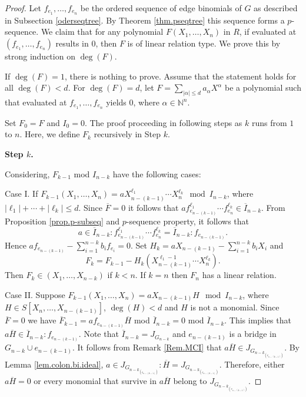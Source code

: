 \documentclass[11pt,a4paper,reqno]{amsart}
\theoremstyle{definition}
\begin{document}
\begin{proof}
     Let $f_{e_1},\ldots,f_{e_n}$ be the ordered sequence of edge binomials of $G$ as described in Subsection \ref{oderseqtree}. By Theorem \ref{thm.pseqtree} this sequence forms a $p$-sequence. We claim that for any polynomial $F(X_1,\ldots,X_n)$ in $R$, if evaluated at $(f_{e_1},\ldots,f_{e_n})$ results in $0$, then $F$ is of linear relation type. We prove this by strong induction on $\deg(F)$. 
     
     If $\deg(F)=1$, there is nothing to prove. Assume that the statement holds for all $\deg(F) < d$. For $\deg(F)=d$, let $F=\sum_{\lvert \alpha \rvert \leq d}a_{\alpha}X^{\alpha}$ be a polynomial such that evaluated at $f_{e_1},\ldots,f_{e_n}$ yields $0$, where $\alpha \in \mathbb{N}^n$. 
     
     \vspace{2mm}

     Set $F_0=F$ and $I_0=0$. The proof proceeding in following steps as $k$ runs from $1$ to $n$. Here, we define $F_k$ recursively in Step $k$. 
     
     \vspace{2mm}
   
    
    \textbf{Step $k$.}
    
    Considering, $F_{k-1}$ mod $I_{n-k}$  have the following cases:

    \vspace{2mm}
    
    Case I. If $F_{k-1}(X_1,\ldots,X_n) = aX_{n-(k-1)}^{\ell_1}\cdots X_n^{\ell_k} \mod I_{n-k}$, where $\lvert \ell_1 \rvert + \cdots + \lvert \ell_k \rvert \leq d$. Since $\overline{F}=0$ it follows that $af_{e_{n-(k-1)}}^{\ell_1}\cdots f_{e_{n}}^{\ell_k} \in \overline{I}_{n-k}$. From Proposition \ref{prop.p-subseq} and $p$-sequence property, it follows that  
    $$a \in \overline{I}_{n-k}:f_{e_{n-(k-1)}}^{\ell_1}\cdots f_{e_{n}}^{\ell_k} = \overline{I}_{n-k}:f_{e_{n-(k-1)}}.$$ 
    Hence $af_{e_{n-(k-1)}}-\sum_{i=1}^{n-k}b_if_{e_i} = 0$. Set $H_k=aX_{n-(k-1)}-\sum_{i=1}^{n-k}b_iX_i$ and $$F_k=F_{k-1}-H_k(X_{n-(k-1)}^{\ell_1-1}\cdots X_n^{\ell_k}).$$ Then $F_k \in (X_1,\ldots,X_{n-k})$ if $k<n$. If $k=n$ then $F_n$ has a linear relation.
    
    \vspace{2mm}
    
    Case II. Suppose $F_{k-1}(X_1,\ldots,X_n) = aX_{n-(k-1)}H \mod I_{n-k}$, where $H \in S[X_n,\ldots,X_{n-(k-1)}]$, $\deg(H)<d$ and $H$ is not a monomial. Since $\overline{F}=0$ we have $\overline{F}_{k-1} = af_{e_{n-(k-1)}}\overline{H}$ mod $\overline{I}_{n-k} = 0 $ mod $\overline{I}_{n-k}$. This implies that $a\overline{H} \in \overline{I}_{n-k}:f_{e_{n-(k-1)}}$.  Note that $\overline{I}_{n-k}=J_{G_{n-k}}$ and $e_{n-(k-1)}$ is a bridge in $G_{n-k} \cup e_{n-(k-1)}$. It follows from Remark \ref{Rem.MCI} that $a\overline{H} \in J_{G_{n-k_{(e_{n-(k-1)})}}}$. By Lemma \ref{lem.colon.bi.ideal},  $a \in J_{G_{n-k_{(e_{n-(k-1)})}}}: \overline{H}= J_{G_{n-k_{(e_{n-(k-1)})}}}$. Therefore, either $a\overline{H}=0$ or every monomial that survive in $a\overline{H}$ belong to $J_{G_{n-k_{(e_{n-(k-1)})}}}$. 



\end{proof}
\end{document}

